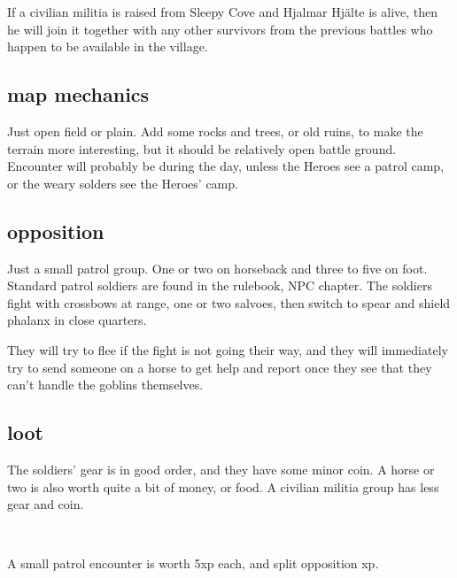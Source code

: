 If a civilian militia is raised from Sleepy Cove and Hjalmar Hjälte is alive, then he will join it together with any other survivors from the previous battles who happen to be available in the village.


\subsection*{map mechanics}

Just open field or plain. Add some rocks and trees, or old ruins, to make the terrain more interesting, but it should be relatively open battle ground.
Encounter will probably be during the day, unless the Heroes see a patrol camp, or the weary solders see the Heroes' camp.


\subsection*{opposition}

Just a small patrol group. One or two on horseback and three to five on foot. Standard patrol soldiers are found in the rulebook, NPC chapter. The soldiers fight with crossbows at range, one or two salvoes, then switch to spear and shield phalanx in close quarters.

They will try to flee if the fight is not going their way, and they will immediately try to send someone on a horse to get help and report once they see that they can't handle the goblins themselves.


\subsection*{loot}

The soldiers' gear is in good order, and they have some minor coin. A horse or two is also worth quite a bit of money, or food. A civilian militia group has less gear and coin.

\

A small patrol encounter is worth 5xp each, and split opposition xp.










\clearpage
